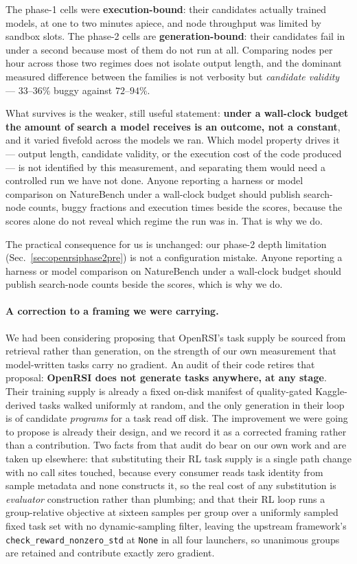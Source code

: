 The phase-1 cells were \textbf{execution-bound}: their candidates actually trained models, at
one to two minutes apiece, and node throughput was limited by sandbox slots. The phase-2 cells
are \textbf{generation-bound}: their candidates fail in under a second because most of them do
not run at all. Comparing nodes per hour across those two regimes does not isolate output
length, and the dominant measured difference between the families is not verbosity but
\emph{candidate validity} --- $33$--$36\%$ buggy against $72$--$94\%$.

What survives is the weaker, still useful statement: \textbf{under a wall-clock budget the
amount of search a model receives is an outcome, not a constant}, and it varied fivefold
across the models we ran. Which model property drives it --- output length, candidate
validity, or the execution cost of the code produced --- is not identified by this
measurement, and separating them would need a controlled run we have not done. Anyone
reporting a harness or model comparison on NatureBench under a wall-clock budget should
publish search-node counts, buggy fractions and execution times beside the scores, because the
scores alone do not reveal which regime the run was in. That is why we do.

The practical consequence for us is unchanged: our phase-2 depth limitation
(Sec.~\ref{sec:openrsiphase2pre}) is not a configuration mistake. Anyone reporting a harness or
model comparison on NatureBench under a wall-clock budget should publish search-node counts
beside the scores, which is why we do.

\paragraph{A correction to a framing we were carrying.}
We had been considering proposing that OpenRSI's task supply be sourced from retrieval rather
than generation, on the strength of our own measurement that model-written tasks carry no
gradient. An audit of their code retires that proposal: \textbf{OpenRSI does not generate
tasks anywhere, at any stage}. Their training supply is already a fixed on-disk manifest of
quality-gated Kaggle-derived tasks walked uniformly at random, and the only generation in
their loop is of candidate \emph{programs} for a task read off disk. The improvement we were
going to propose is already their design, and we record it as a corrected framing rather than
a contribution. Two facts from that audit do bear on our own work and are taken up elsewhere:
that substituting their RL task supply is a single path change with no call sites touched,
because every consumer reads task identity from sample metadata and none constructs it, so the
real cost of any substitution is \emph{evaluator} construction rather than plumbing; and that
their RL loop runs a group-relative objective at sixteen samples per group over a uniformly
sampled fixed task set with no dynamic-sampling filter, leaving the upstream framework's
\texttt{check\_reward\_nonzero\_std} at \texttt{None} in all four launchers, so unanimous
groups are retained and contribute exactly zero gradient.

